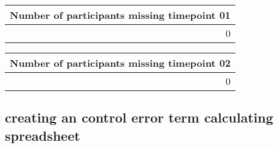 \documentclass[]{article}
\newenvironment{Shaded}{\begin{snugshade}}{\end{snugshade}}
\newcommand{\KeywordTok}[1]{\textcolor[rgb]{0.13,0.29,0.53}{\textbf{#1}}}
\newcommand{\DataTypeTok}[1]{\textcolor[rgb]{0.13,0.29,0.53}{#1}}
\newcommand{\DecValTok}[1]{\textcolor[rgb]{0.00,0.00,0.81}{#1}}
\newcommand{\StringTok}[1]{\textcolor[rgb]{0.31,0.60,0.02}{#1}}
\newcommand{\OperatorTok}[1]{\textcolor[rgb]{0.81,0.36,0.00}{\textbf{#1}}}
\newcommand{\NormalTok}[1]{#1}
\theoremstyle{definition}
\theoremstyle{definition}
\theoremstyle{definition}
\theoremstyle{remark}
\begin{document}
\begin{tabular}{r}
\hline
Number of participants missing timepoint 01\\
\hline
0\\
\hline
\end{tabular}

\begin{Shaded}
\end{Shaded}

\begin{tabular}{r}
\hline
Number of participants missing timepoint 02\\
\hline
0\\
\hline
\end{tabular}

\subsection{creating an control error term calculating
spreadsheet}\label{creating-an-control-error-term-calculating-spreadsheet}
\end{document}
